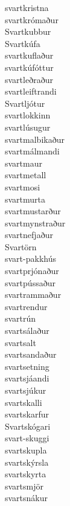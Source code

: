 \documentclass[../samsetningasafn.tex]{subfiles}
\begin{document}
\begin{bigwordlist}
\begin{footnotesize}
\begin{multicols}{4}
\begin{description}
		\item [svartkristna]
		\item [svartkrómaður]
		\item [Svartkubbur]
		\item [Svartkúfa]
		\item [svartkuflaður]
		\item [svartkúfóttur]
		\item [svartleðraður]
		\item [svartleiftrandi]
		\item [Svartljótur]
		\item [svartlokkinn]
		\item [svartlúsugur]
		\item [svartmalbikaður]
		\item [svartmálmandi]
		\item [svartmaur]
		\item [svartmetall]
		\item [svartmosi]
		\item [svartmurta]
		\item [svartmustarður]
		\item [svartmynstraður]
		\item [svartnefjaður]
		\item [Svartörn]
		\item [svart-pakkhús]
		\item [svartprjónaður]
		\item [svartpússaður]
		\item [svartrammaður]
		\item [svartrendur]
		\item [svartrún]
		\item [svartsálaður]
		\item [svartsalt]
		\item [svartsandaður]
		\item [svartsetning]
		\item [svartsjáandi]
		\item [svartsjúkur]
		\item [svartskalli]
		\item [svartskarfur]
		\item [Svartskógari]
		\item [svart-skuggi]
		\item [svartskupla]
		\item [svartskýrsla]
		\item [svartskyrta]
		\item [svartsmjör]
		\item [svartsnákur]

\end{description}
\end{multicols}
\end{footnotesize}
\end{bigwordlist}
\end{document}
